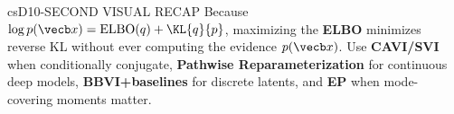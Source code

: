 \documentclass[../../../../master.tex]{subfiles}
\begin{document}
\begin{cscolumns}
\begin{cscard}{csD}{10-SECOND VISUAL RECAP}
  \sffamily\footnotesize
  Because $\log p(\vecb x) = \mathrm{ELBO}(q) + \KL{q}{p}$, maximizing the \textbf{ELBO} minimizes reverse KL without ever computing the evidence $p(\vecb x)$.
  Use \textbf{CAVI/SVI} when conditionally conjugate, \textbf{Pathwise Reparameterization} for continuous deep models, \textbf{BBVI+baselines} for discrete latents, and \textbf{EP} when mode-covering moments matter.
\end{cscard}
\end{cscolumns}

\csend
\end{document}

